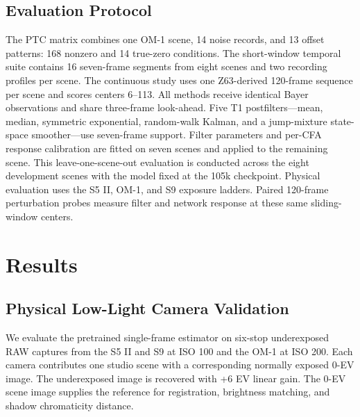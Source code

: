 \subsection{Evaluation Protocol}
The PTC matrix combines one OM-1 scene, 14 noise records, and 13 offset patterns: 168 nonzero and 14 true-zero conditions. The short-window temporal suite contains 16 seven-frame segments from eight scenes and two recording profiles per scene. The continuous study uses one Z63-derived 120-frame sequence per scene and scores centers 6--113. All methods receive identical Bayer observations and share three-frame look-ahead. Five T1 postfilters---mean, median, symmetric exponential, random-walk Kalman, and a jump-mixture state-space smoother---use seven-frame support. Filter parameters and per-CFA response calibration are fitted on seven scenes and applied to the remaining scene. This leave-one-scene-out evaluation is conducted across the eight development scenes with the model fixed at the 105k checkpoint. Physical evaluation uses the S5 II, OM-1, and S9 exposure ladders. Paired 120-frame perturbation probes measure filter and network response at these same sliding-window centers.


\section{Results}
\label{sec:results}

\subsection{Physical Low-Light Camera Validation}
We evaluate the pretrained single-frame estimator on six-stop underexposed RAW captures from the S5 II and S9 at ISO 100 and the OM-1 at ISO 200. Each camera contributes one studio scene with a corresponding normally exposed 0-EV image. The underexposed image is recovered with +6 EV linear gain. The 0-EV scene image supplies the reference for registration, brightness matching, and shadow chromaticity distance.

